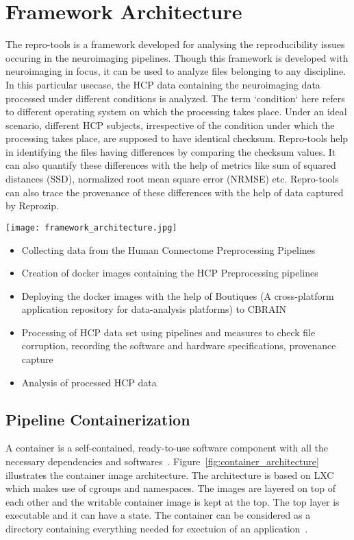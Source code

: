 \chapter{Framework Architecture}
The repro-tools  is a framework developed for analysing the reproducibility issues occuring in the neuroimaging pipelines. Though this framework is developed with neuroimaging in focus, it can be used to analyze files belonging to any discipline. In this particular usecase, the HCP data containing the neuroimaging data processed under different conditions is analyzed. The term `condition` here refers to different operating system on which the processing takes place. Under an ideal scenario, different HCP subjects, irrespective of the condition under which the processing takes place, are supposed to have identical checksum. Repro-tools help in identifying the files having differences by comparing the checksum values. It can also quantify these differences with the help of metrics like sum of squared distances (SSD), normalized root mean square error (NRMSE) etc. Repro-tools can also trace the provenance of these differences with the help of data captured by Reprozip.

\begin{center}
\texttt{[image: framework\_architecture.jpg]}
\label{fig:framework_architecture}
\end{center}

  \begin{itemize}
  \item Collecting data from the Human Connectome Preprocessing Pipelines~\cite{DBHumanConnectome}
  \item Creation of docker images containing the HCP Preprocessing pipelines
  \item Deploying the docker images with the help of Boutiques (A cross-platform application repository for data-analysis platforms) to CBRAIN
  \item Processing of HCP data set using pipelines and measures to check file corruption, recording the software and hardware specifications, provenance capture
  \item Analysis of processed HCP data
  \end{itemize}

\section{Pipeline Containerization}
A container is a self-contained, ready-to-use software component with all the necessary dependencies and softwares~\cite{7158965}. Figure~\ref{fig:container_architecture} illustrates the container image architecture. The architecture is based on LXC which makes use of  cgroups and namespaces. The images are layered on top of each other and the writable container image is kept at the top. The top layer is executable and it can have a state. The container can be considered as a directory containing everything needed for exectuion of an application~\cite{7158965}.

